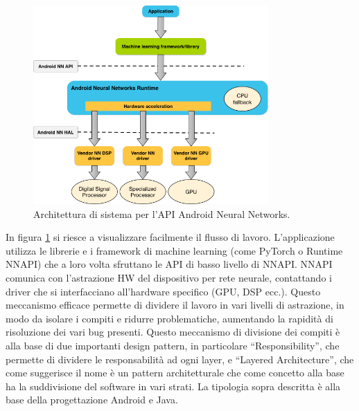\begin{figure}
    \centering
    \includegraphics[width=0.8\textwidth]{Immagini/nnapi_architecture.png}
    \caption{Architettura di sistema per l'API Android Neural Networks.}
    \label{fig:nnapiArchitecture}
\end{figure}

In figura \ref{fig:nnapiArchitecture} si riesce a visualizzare facilmente il flusso di lavoro. L’applicazione utilizza le librerie e i framework di machine
learning (come PyTorch o Runtime NNAPI) che a loro volta sfruttano le API di basso livello di NNAPI.
NNAPI comunica con l’astrazione HW del dispositivo per rete neurale, contattando i driver che si interfacciano all’hardware specifico (GPU, DSP ecc.).
Questo meccanismo efficace permette di dividere il lavoro in vari livelli di astrazione, in modo da isolare i compiti e ridurre problematiche, aumentando
la rapidità di risoluzione dei vari bug presenti. Questo meccanismo di divisione dei compiti è alla base di due importanti design pattern, in particolare
“Responsibility”, che permette di dividere le responsabilità ad ogni layer, e “Layered Architecture”, che come suggerisce il nome è un pattern architetturale
che come concetto alla base ha la suddivisione del software in vari strati. La tipologia sopra descritta è alla base della progettazione Android e Java.

